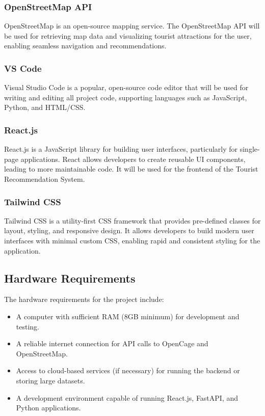 \subsubsection{OpenStreetMap API}
OpenStreetMap is an open-source mapping service. The OpenStreetMap API will be used for retrieving map data and visualizing tourist attractions for the user, enabling seamless navigation and recommendations.

\subsubsection{VS Code}
Visual Studio Code is a popular, open-source code editor that will be used for writing and editing all project code, supporting languages such as JavaScript, Python, and HTML/CSS.

\subsubsection{React.js}
React.js is a JavaScript library for building user interfaces, particularly for single-page applications. React allows developers to create reusable UI components, leading to more maintainable code. It will be used for the frontend of the Tourist Recommendation System.

\subsubsection{Tailwind CSS}
Tailwind CSS is a utility-first CSS framework that provides pre-defined classes for layout, styling, and responsive design. It allows developers to build modern user interfaces with minimal custom CSS, enabling rapid and consistent styling for the application.



\subsection{Hardware Requirements}
The hardware requirements for the project include:

\begin{itemize}
    \item A computer with sufficient RAM (8GB minimum) for development and testing.
    \item A reliable internet connection for API calls to OpenCage and OpenStreetMap.
    \item Access to cloud-based services (if necessary) for running the backend or storing large datasets.
    \item A development environment capable of running React.js, FastAPI, and Python applications.
\end{itemize}

